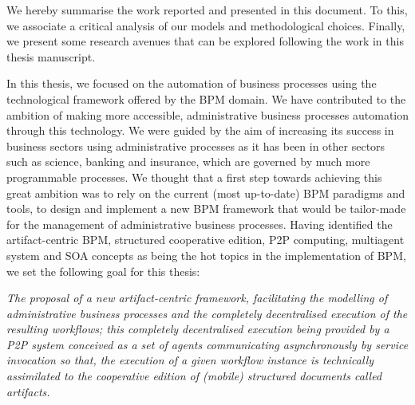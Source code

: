 \label{chap5:general-conclusion}

We hereby summarise the work reported and presented in this document. To this, we associate a critical analysis of our models and methodological choices. Finally, we present some research avenues that can be explored following the work in this thesis manuscript.

In this thesis, we focused on the automation of business processes using the technological framework offered by the BPM domain. 
We have contributed to the ambition of making more accessible, administrative business processes automation through this technology. We were guided by the aim of increasing its success in business sectors using administrative processes as it has been in other sectors such as science, banking and insurance, which are governed by much more programmable processes. 
We thought that a first step towards achieving this great ambition was to rely on the current (most up-to-date) BPM paradigms and tools, to design and implement a new BPM framework that would be tailor-made for the management of administrative business processes. 
Having identified the artifact-centric BPM, structured cooperative edition, P2P computing, multiagent system and SOA concepts as being the hot topics in the implementation of BPM, we set the following goal for this thesis:
\begin{displayquote}
	\textit{The proposal of a new artifact-centric framework, facilitating the modelling of administrative business processes and the completely decentralised execution of the resulting workflows; this completely decentralised execution being provided by a P2P system conceived as a set of agents communicating asynchronously by service invocation so that, the execution of a given workflow instance is technically assimilated to the cooperative edition of (mobile) structured documents called artifacts.}
\end{displayquote}

